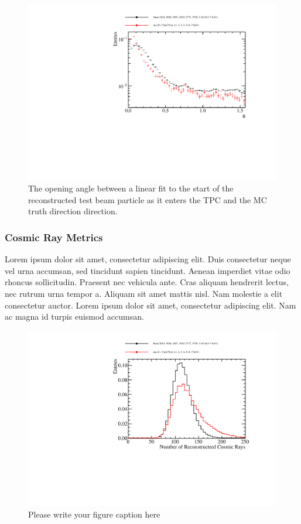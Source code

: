 \begin{figure}
\includegraphics[width=1.0\textwidth]{Figures/Metrics/Data/Beam/BeamParticleOpeningAngle.pdf}
\caption{The opening angle between a linear fit to the start of the reconstructed test beam particle as it enters the TPC and the MC truth direction direction.}
\label{fig:8}
\end{figure}

\subsubsection{Cosmic Ray Metrics}

Lorem ipsum dolor sit amet, consectetur adipiscing elit. Duis consectetur neque vel urna accumsan, sed tincidunt sapien tincidunt. Aenean imperdiet vitae odio rhoncus sollicitudin. Praesent nec vehicula ante. Cras aliquam hendrerit lectus, nec rutrum urna tempor a. Aliquam sit amet mattis nisl. Nam molestie a elit consectetur auctor. Lorem ipsum dolor sit amet, consectetur adipiscing elit. Nam ac magna id turpis euismod accumsan.

\begin{figure}
\includegraphics[width=1.0\textwidth]{Figures/Metrics/Data/Cosmics/NumberofReconstructedCosmicRays.pdf}
\caption{Please write your figure caption here}
\label{fig:9}
\end{figure}

